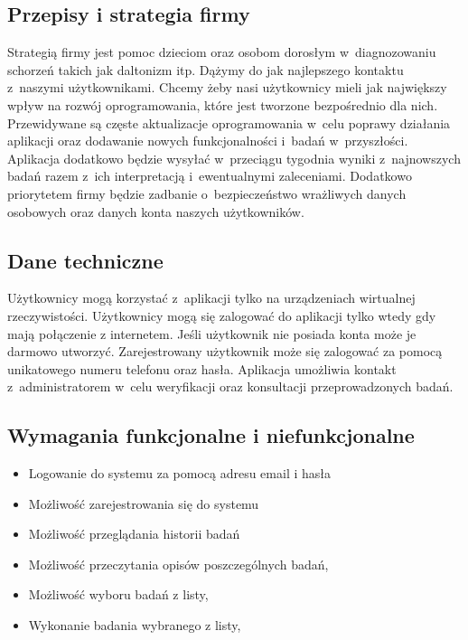 \documentclass[12pt, letterpaper]{article}
\begin{document}
	\subsection{Przepisy i strategia firmy}
	
	Strategią firmy jest pomoc dzieciom oraz osobom dorosłym w~diagnozowaniu schorzeń takich jak daltonizm itp. Dążymy do jak najlepszego kontaktu z~naszymi użytkownikami. Chcemy żeby nasi użytkownicy mieli jak największy wpływ na rozwój oprogramowania, które jest tworzone bezpośrednio dla nich. Przewidywane są częste aktualizacje oprogramowania w~celu poprawy działania aplikacji oraz dodawanie nowych funkcjonalności i~badań w~przyszłości. Aplikacja dodatkowo będzie wysyłać w~przeciągu tygodnia wyniki z~najnowszych badań razem z~ich interpretacją i~ewentualnymi zaleceniami. Dodatkowo priorytetem firmy będzie zadbanie o~bezpieczeństwo wrażliwych danych osobowych oraz danych konta naszych użytkowników.
	

	\subsection{Dane techniczne}
	
	Użytkownicy mogą korzystać z~aplikacji tylko na urządzeniach wirtualnej rzeczywistości. Użytkownicy mogą się zalogować do aplikacji tylko wtedy gdy mają połączenie z internetem. Jeśli użytkownik nie posiada konta może je darmowo utworzyć. Zarejestrowany użytkownik może się zalogować za pomocą unikatowego numeru telefonu oraz hasła. Aplikacja umożliwia kontakt z~administratorem w~celu weryfikacji oraz konsultacji przeprowadzonych badań.
	

	\newpage	
	
	\subsection{Wymagania funkcjonalne i niefunkcjonalne}

		
			\begin{itemize}
				\item Logowanie do systemu za pomocą adresu email i hasła
				\item Możliwość zarejestrowania się do systemu
				\item Możliwość przeglądania historii badań
				\item Możliwość przeczytania opisów poszczególnych badań,
				\item Możliwość wyboru badań z listy,
				\item Wykonanie badania wybranego z listy,
			\end{itemize}
			
\end{document}
